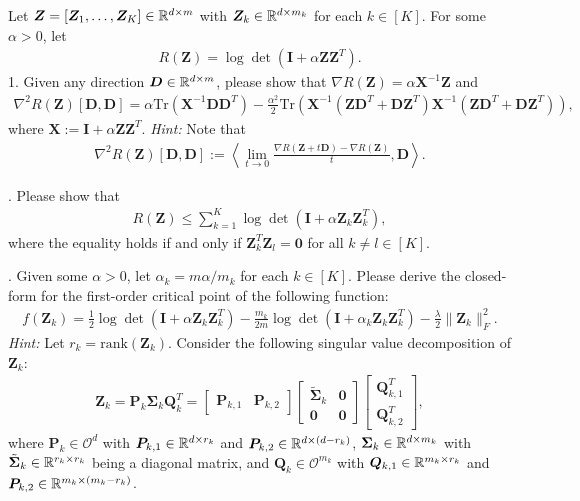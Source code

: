 \documentclass[\toplevelprefix/book-main.tex]{subfiles}
\begin{document}
\begin{exercise}
    Let $\bm Z = [\bm Z_1,\dots,\bm Z_K] \in \mathbb{R}^{d\times m}$ with $\bm Z_k \in \mathbb{R}^{d\times m_k}$ for each $k \in [K]$. For some $\alpha > 0$, let 
    \begin{align*}
        R(\bm Z) = \log\det\left(\bm I + \alpha\bm Z\bm Z^T \right).
    \end{align*}
1. Given any direction $\bm D \in \mathbb{R}^{d\times m}$, please show that $\nabla R(\bm Z) = \alpha\bm X^{-1}\bm Z$ and 
    \begin{align*}
 \nabla^2 R(\bm Z)[\bm D, \bm D] =\alpha \mathrm{Tr}\left( \bm X^{-1}\bm D\bm D^T\right) - \frac{\alpha^2}{2}\mathrm{Tr}\left(\bm X^{-1}\left( \bm Z\bm D^T+\bm D\bm Z^T\right) \bm X^{-1}\left( \bm Z\bm D^T+\bm D\bm Z^T\right)\right),
    \end{align*}
    where $\bm X := \bm I + \alpha\bm Z\bm Z^T$. {\em Hint:} Note that
    \begin{align*}
        \nabla^2 R(\bm Z)[\bm D, \bm D] := \left\langle \lim_{t \to 0} \frac{\nabla R(\bm Z+ t\bm D) - \nabla R(\bm Z)}{t}, \bm D \right\rangle. 
    \end{align*}

. Please show that 
\begin{align*}
    R(\bm Z) \le \sum_{k=1}^K \log\det\left(\bm I + \alpha\bm Z_k\bm Z_k^T \right),
\end{align*}
where the equality holds if and only if $\bm Z_k^T\bm Z_l = \bm 0$ for all $k \neq l \in [K]$. 
\medskip 

. Given some $\alpha >0$, let $\alpha_k=m\alpha/m_k$ for each $k \in [K]$. Please derive the closed-form for the first-order critical point of the following function: 
\begin{align*}
    f(\bm Z_k) = \frac{1}{2}\log\det\left(\bm I + \alpha\bm Z_k\bm Z_k^T \right) - \frac{m_k}{2m}\log\det\left(\bm I + \alpha_k \bm Z_k\bm Z_k^T \right) - \frac{\lambda}{2}\|\bm Z_k\|_F^2. 
\end{align*}
{\em Hint:} Let $r_k=\mathrm{rank}(\bm Z_k)$. Consider the following singular value decomposition of $\bm Z_k$: 
\begin{align*}
    \bm Z_k = \bm P_k\bm \Sigma_k\bm Q_k^T = \begin{bmatrix}
        \bm P_{k,1} & \bm P_{k,2}
    \end{bmatrix} \begin{bmatrix}
        \tilde{\bm \Sigma}_{k} & \bm 0 \\
        \bm 0 & \bm 0
    \end{bmatrix} 
    \begin{bmatrix}
        \bm Q_{k,1}^T \\ \bm Q_{k,2}^T
    \end{bmatrix}, 
\end{align*}
where $\bm P_k \in \mathcal{O}^d$ with $\bm P_{k,1} \in \mathbb{R}^{d\times r_k}$ and  $\bm P_{k,2} \in \mathbb{R}^{d\times (d-r_k)}$, $\bm \Sigma_k \in \mathbb{R}^{d\times m_k}$ with $\tilde{\bm \Sigma}_{k} \in \mathbb{R}^{r_k\times r_k}$ being a diagonal matrix, and  $\bm Q_k \in \mathcal{O}^{m_k}$ with $\bm Q_{k,1} \in \mathbb{R}^{m_k\times r_k}$ and  $\bm P_{k,2} \in \mathbb{R}^{m_k \times (m_k-r_k)}$. 
\medskip 


\end{exercise}
\end{document}

